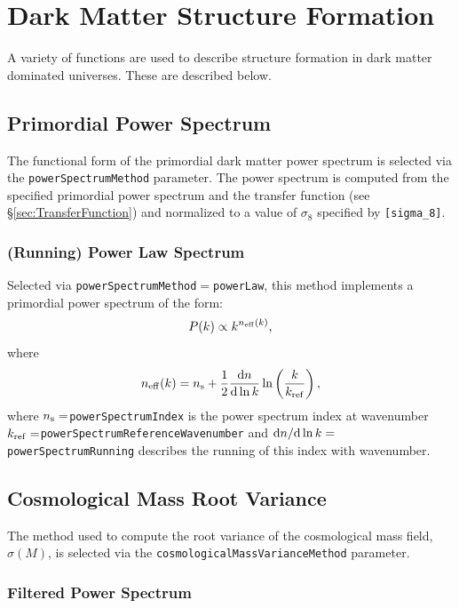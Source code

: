 \section{Dark Matter Structure Formation}

A variety of functions are used to describe structure formation in dark matter dominated universes. These are described below.

\subsection{Primordial Power Spectrum}\label{sec:PrimordialPowerSpectrum}

The functional form of the primordial dark matter power spectrum is selected via the {\tt powerSpectrumMethod} parameter. The power spectrum is computed from the specified primordial power spectrum and the transfer function (see \S\ref{sec:TransferFunction}) and normalized to a value of $\sigma_8$ specified by {\tt [sigma\_8]}.

\subsubsection{(Running) Power Law Spectrum}

Selected via {\tt powerSpectrumMethod}$=${\tt powerLaw}, this method implements a primordial power spectrum of the form:
\begin{equation}
 P(k) \propto k^{n_{\rm eff}(k)},
\end{equation}
where
\begin{equation}
 n_{\rm eff}(k) = n_{\rm s} + {1\over 2}{\d n \over \d \ln k} \ln \left( {k \over k_{\rm ref}} \right),
\end{equation}
where $n_{\rm s}=${\tt powerSpectrumIndex} is the power spectrum index at wavenumber $k_{\rm ref}=${\tt powerSpectrumReferenceWavenumber} and $\d n / \d \ln k=${\tt powerSpectrumRunning} describes the running of this index with wavenumber.

\subsection{Cosmological Mass Root Variance}

The method used to compute the root variance of the cosmological mass field, $\sigma(M)$, is selected via the {\tt cosmologicalMassVarianceMethod} parameter.
\subsubsection{Filtered Power Spectrum}

